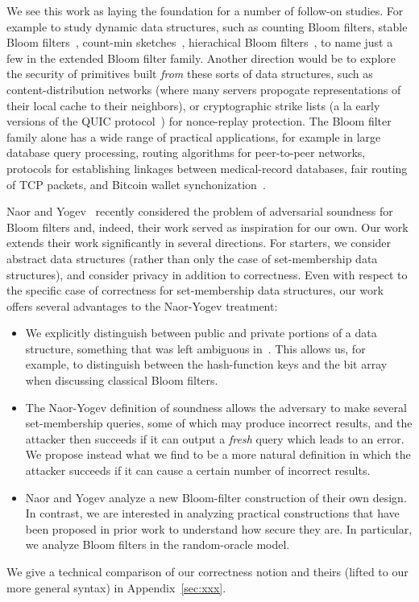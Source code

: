 We see this work as laying the foundation for a number of follow-on studies.  For example to study dynamic data structures, such as counting Bloom filters\cite{xxx}, stable Bloom filters~\cite{xxx}, count-min sketches~\cite{xxx}, hierachical Bloom filters~\cite{xxx}, to name just a few in the extended Bloom filter family.  Another direction would be to explore the security of primitives built \emph{from} these sorts of data structures, such as content-distribution networks (where many servers propogate representations of their local cache to their neighbors), or cryptographic strike lists (a la early versions of the QUIC protocol~\cite{xxx}) for nonce-replay protection.  The Bloom filter family alone has a wide range of practical applications, for example in large database query
processing, routing algorithms for peer-to-peer networks, protocols
for establishing linkages between medical-record databases, fair
routing of TCP packets, and Bitcoin wallet synchonization~\cite{schnell2011novel,niedermeyer2014cryptanalysis,gervais2014privacy,nojima2009cryptographically,feng2001stochastic,reynolds2003efficient,byers2002informed,broder2004network}.


 Naor and
Yogev~\cite{naor2015bloom} recently considered the problem of
adversarial soundness for Bloom filters and, indeed,
their work served as inspiration for our own. Our work extends
their work significantly in several directions. For starters, we
consider abstract data structures (rather than only the case of
set-membership data structures), and consider privacy in addition to
correctness. Even with respect to the specific case of correctness for
set-membership data structures, our work offers several advantages
to the Naor-Yogev treatment:
\begin{itemize}
\item We explicitly distinguish between public and private
    portions of a data structure, something that was left
    ambiguous in~\cite{naor2015bloom}. This allows us, for
    example, to distinguish between the hash-function keys and
    the bit array when discussing classical Bloom filters.
\item The Naor-Yogev definition of soundness allows the
    adversary to make several set-membership queries, some of
    which may produce incorrect results, and the attacker then
    succeeds if it can output a \emph{fresh} query which leads
    to an error. We propose instead what we find to be a more
    natural definition in which the attacker succeeds if it can
    cause a certain number of incorrect results.
\item Naor and Yogev analyze a new Bloom-filter construction of
    their own design. In contrast, we are interested in
    analyzing practical constructions that have been proposed in
    prior work to understand how secure they are. In particular,
    we analyze Bloom filters in the random-oracle model.
\end{itemize}
We give a technical comparison of our correctness notion and theirs (lifted to our more general syntax)
in Appendix~\ref{sec:xxx}. 

